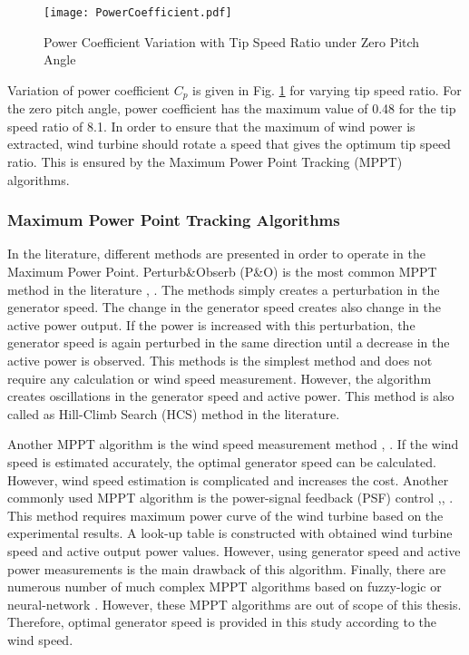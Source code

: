 \begin{figure}[h!]
	\centering
	\texttt{[image: PowerCoefficient.pdf]}
	\caption{Power Coefficient Variation with Tip Speed Ratio under Zero Pitch Angle}
	\label{variationofcp}
\end{figure} 
\par
Variation of power coefficient $C_{p}$ is given in Fig. \ref{variationofcp} for varying tip speed ratio. For the zero pitch angle, power coefficient has the maximum value of 0.48 for the tip speed ratio of 8.1. In order to ensure that the maximum of wind power is extracted, wind turbine should rotate a speed that gives the optimum tip speed ratio. This is ensured by the Maximum Power Point Tracking (MPPT) algorithms. 
\subsubsection{Maximum Power Point Tracking Algorithms}
In the literature, different methods are presented in order to operate in the Maximum Power Point. Perturb\&Obserb (P\&O) is the most common MPPT method in the literature \cite{Wang2004}, \cite{Barakati2009}. The methods simply creates a perturbation in the generator speed. The change in the generator speed creates also change in the active power output. If the power is increased with this perturbation, the generator speed is again perturbed in the same direction until a decrease in the active power is observed. This methods is the simplest method and does not require any calculation or wind speed measurement. However, the algorithm creates oscillations in the generator speed and active power. This method is also called as Hill-Climb Search (HCS) method in the literature.\par
Another MPPT algorithm is the wind speed measurement method \cite{Thriringer1993}, \cite{C.A.2013}. If the wind speed is estimated accurately, the optimal generator speed can be calculated. However, wind speed estimation is complicated and increases the cost. Another commonly used MPPT algorithm is the power-signal feedback (PSF) control \cite{C.A.2013},\cite{Wang2004}, \cite{Lu2002}. This method requires maximum power curve of the wind turbine based on the experimental results. A look-up table is constructed with obtained wind turbine speed and active output power values. However, using generator speed and active power measurements is the main drawback of this algorithm. Finally, there are numerous number of much complex MPPT algorithms based on fuzzy-logic \cite{Zeng2008} or neural-network \cite{Lin2011}. However, these MPPT algorithms are out of scope of this thesis. Therefore, optimal generator speed is provided in this study according to the wind speed. 
